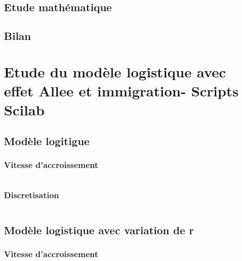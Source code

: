 \documentclass{article}
\begin{document}
\paragraph{}

\subsection{Etude mathématique}

\subsection{Bilan}
\paragraph{}


\newpage
\appendix

\section{Etude du modèle logistique avec effet Allee et immigration- Scripts Scilab}

\subsection{Modèle logitigue}

\subsubsection{Vitesse d'accroissement}

\begin{verbatim}
\end{verbatim}

\subsubsection{Discretisation}

\begin{verbatim}
\end{verbatim}

\subsection{Modèle logistique avec variation de r}

\subsubsection{Vitesse d'accroissement}
\end{document}
